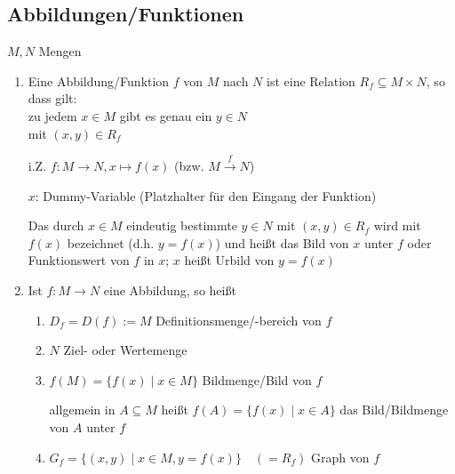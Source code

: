 \clearpage
\subsection{Abbildungen/Funktionen}
\Def $M,N$ Mengen

\begin{enumerate}
	\item Eine Abbildung/Funktion $f$ von $M$ nach $N$ ist eine Relation $R_f \subseteq M\times N$, so dass gilt:\\
	zu jedem $x\in M$ gibt es genau ein $y\in N$\\
	mit $(x,y)\in R_f$
	
	i.Z. $f:M\to N,x\mapsto f(x)$ (bzw. $M \stackrel{f}{\to} N$)
	
	
	$x$: Dummy-Variable (Platzhalter für den {\flqq Eingang\frqq} der Funktion)
	
	Das durch $x\in M$ eindeutig bestimmte $y\in N$ mit $(x,y)\in R_f$ wird mit $f(x)$ bezeichnet (d.h. $y=f(x)$) und heißt das Bild von $x$ unter $f$ oder Funktionswert von $f$ in $x$; $x$ heißt Urbild von $y=f(x)$
	
	\item Ist $f:M\to N$ eine Abbildung, so heißt
	\begin{enumerate}
		\item $D_f = D(f):=M$ \hfill Definitionsmenge/-bereich von $f$
		\item $N$ \hfill Ziel- oder Wertemenge
		\item $f(M)=\{f(x)\mid x\in M\}$ \hfill Bildmenge/Bild von $f$
		
		allgemein in $A\subseteq M$ heißt $f(A)=\{f(x)\mid x\in A\}$ das Bild/Bildmenge von $A$ unter $f$
		\item $G_f=\{(x,y)\mid x\in M, y=f(x)\}\quad(=R_f)$
		\hfill Graph von $f$
	\end{enumerate}
\end{enumerate}

\Bsps

